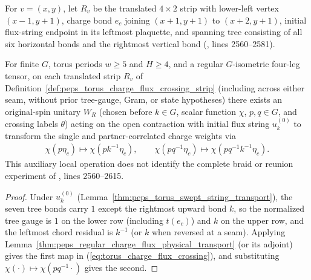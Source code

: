 \begin{definition}
    \label{def:peps_torus_charge_flux_crossing_strip}
    \leanok
    For $v=(x,y)$, let $R_v$ be the translated $4\times 2$ strip with lower-left vertex $(x-1,y+1)$, charge bond $e_c$ joining $(x+1,y+1)$ to $(x+2,y+1)$, initial flux-string endpoint in its leftmost plaquette, and spanning tree consisting of all six horizontal bonds and the rightmost vertical bond (\cite{Schuch2010PEPS}, lines 2560--2581).
\end{definition}

\begin{lemma}
    \label{thm:peps_torus_charge_flux_crossing}
    \leanok
    For finite $G$, torus periods $w\ge 5$ and $H\ge 4$, and a regular $G$-isometric four-leg tensor, on each translated strip $R_v$ of Definition~\ref{def:peps_torus_charge_flux_crossing_strip} (including across either seam, without prior tree-gauge, Gram, or state hypotheses) there exists an original-spin unitary $W_R$ (chosen before $k\in G$, scalar function $\chi$, $p,q\in G$, and crossing labels $\theta$) acting on the open contraction with initial flux string $u^{(0)}_k$ to transform the single and partner-correlated charge weights via
    \begin{align}
        \chi(p\eta_c)\longmapsto\chi(pk^{-1}\eta_c),\qquad
        \chi(pq^{-1}\eta_c)\longmapsto\chi(pq^{-1}k^{-1}\eta_c). \label{eq:torus_charge_flux_crossing}
    \end{align}
    This auxiliary local operation does not identify the complete braid or reunion experiment of \cite{Schuch2010PEPS}, lines 2560--2615.
\end{lemma}
\begin{proof}\leanok
    Under $u^{(0)}_k$ (Lemma~\ref{thm:peps_torus_swept_string_transport}), the seven tree bonds carry $1$ except the rightmost upward bond $k$, so the normalized tree gauge is $1$ on the lower row (including $t(e_c)$) and $k$ on the upper row, and the leftmost chord residual is $k^{-1}$ (or $k$ when reversed at a seam).
    Applying Lemma~\ref{thm:peps_regular_charge_flux_physical_transport} (or its adjoint) gives the first map in (\ref{eq:torus_charge_flux_crossing}), and substituting $\chi(\cdot)\mapsto\chi(pq^{-1}\cdot)$ gives the second.
\end{proof}
